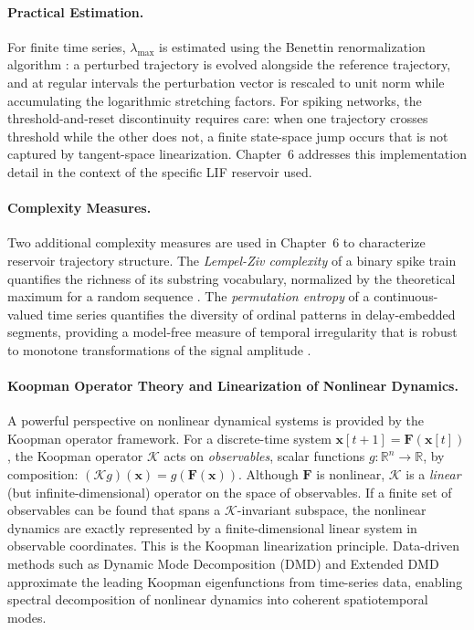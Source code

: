 \paragraph{Practical Estimation.}
For finite time series, $\lambda_{\max}$ is estimated using the Benettin renormalization algorithm \cite{benettin_lyapunov_1980}: a perturbed trajectory is evolved alongside the reference trajectory, and at regular intervals the perturbation vector is rescaled to unit norm while accumulating the logarithmic stretching factors. For spiking networks, the threshold-and-reset discontinuity requires care: when one trajectory crosses threshold while the other does not, a finite state-space jump occurs that is not captured by tangent-space linearization. Chapter~6 addresses this implementation detail in the context of the specific LIF reservoir used.

\paragraph{Complexity Measures.}
Two additional complexity measures are used in Chapter~6 to characterize reservoir trajectory structure. The \emph{Lempel-Ziv complexity} of a binary spike train quantifies the richness of its substring vocabulary, normalized by the theoretical maximum for a random sequence \cite{bandt_permutation_2002}. The \emph{permutation entropy} of a continuous-valued time series quantifies the diversity of ordinal patterns in delay-embedded segments, providing a model-free measure of temporal irregularity that is robust to monotone transformations of the signal amplitude \cite{bandt_permutation_2002}.

\paragraph{Koopman Operator Theory and Linearization of Nonlinear Dynamics.}
A powerful perspective on nonlinear dynamical systems is provided by the Koopman operator framework. For a discrete-time system $\mathbf{x}[t+1] = \mathbf{F}(\mathbf{x}[t])$, the Koopman operator $\mathcal{K}$ acts on \emph{observables}, scalar functions $g: \mathbb{R}^n \to \mathbb{R}$, by composition: $(\mathcal{K} g)(\mathbf{x}) = g(\mathbf{F}(\mathbf{x}))$. Although $\mathbf{F}$ is nonlinear, $\mathcal{K}$ is a \emph{linear} (but infinite-dimensional) operator on the space of observables. If a finite set of observables can be found that spans a $\mathcal{K}$-invariant subspace, the nonlinear dynamics are exactly represented by a finite-dimensional linear system in observable coordinates. This is the Koopman linearization principle. Data-driven methods such as Dynamic Mode Decomposition (DMD) and Extended DMD approximate the leading Koopman eigenfunctions from time-series data, enabling spectral decomposition of nonlinear dynamics into coherent spatiotemporal modes.

